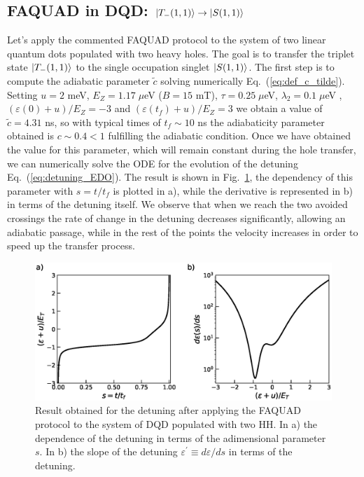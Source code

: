 \documentclass[a4paper,11pt]{article}
\begin{document}
\subsection{FAQUAD in DQD: $\ket{T_-(1,1)}\rightarrow\ket{S(1,1)}$}
Let's apply the commented FAQUAD protocol to the system of two linear quantum dots populated with two heavy holes. The goal is to transfer the triplet state $\ket{T_-(1,1)}$ to the single occupation singlet $\ket{S(1,1)}$. The first step is to compute the adiabatic parameter $\tilde{c}$ solving numerically Eq.~(\ref{eq:def_c_tilde}). Setting $u=2$ meV, $E_Z=1.17\; \mu$eV ($B=15$ mT), $\tau=0.25 \; \mu$eV, $\lambda_2=0.1\; \mu$eV , $(\varepsilon(0)+u)/E_Z=-3$ and $(\varepsilon(t_f)+u)/E_Z=3$ we obtain a value of $\tilde{c}=4.31$ ns, so with typical times of $t_f\sim 10$ ns the adiabaticity parameter obtained is $c\sim 0.4< 1$ fulfilling the adiabatic condition. Once we have obtained the value for this parameter, which will remain constant during the hole transfer, we can numerically solve the ODE for the evolution of the detuning Eq.~(\ref{eq:detuning_EDO}). The result is shown in Fig.~\ref{fig:FAQUAD_detuning_2QD_2HH}, the dependency of this parameter with $s=t/t_f$ is plotted in a), while the derivative is represented in b) in terms of the detuning itself. We observe that when we reach the two avoided crossings the rate of change in the detuning decreases significantly, allowing an adiabatic passage, while in the rest of the points the velocity increases in order to speed up the transfer process.
\begin{figure}[!htbp]
	\centering
	\includegraphics[width=1\linewidth]{FAQUAD_detuning_2QD_2HH.eps}
	\caption{Result obtained for the detuning after applying the FAQUAD protocol to the system of DQD populated with two HH. In a) the dependence of the detuning in terms of the adimensional parameter $s$. In b) the slope of the detuning $\varepsilon^\prime\equiv d \varepsilon/d s$ in terms of the detuning.}
	\label{fig:FAQUAD_detuning_2QD_2HH}
\end{figure}\\
\end{document}
